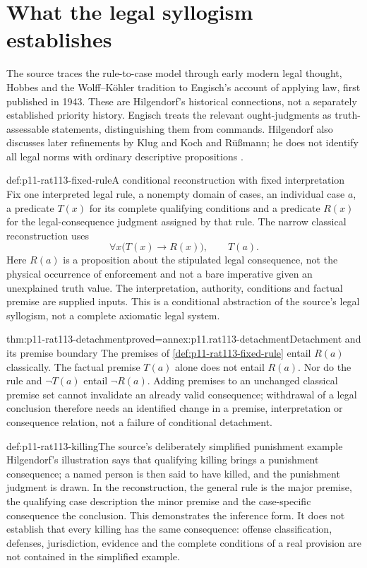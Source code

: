 \section{What the legal syllogism establishes}
\label{sec:p11-rat113-syllogism}

The source traces the rule-to-case model through early modern legal thought,
Hobbes and the Wolff--K\"ohler tradition to Engisch's account of applying
law, first published in 1943. These are Hilgendorf's historical connections,
not a separately established priority history. Engisch treats the relevant
ought-judgments as truth-assessable statements, distinguishing them from
commands. Hilgendorf also discusses later refinements by Klug and Koch and
R\"u\ss mann; he does not identify all legal norms with ordinary descriptive
propositions \parencite[pp.~661--662]{Hilgendorf2021LegalLogic}.

\begin{hbdefinition}{def:p11-rat113-fixed-rule}{A conditional reconstruction with fixed interpretation}
Fix one interpreted legal rule, a nonempty domain of cases, an individual
case \(a\), a predicate \(T(x)\) for its complete qualifying conditions
and a predicate \(R(x)\) for the legal-consequence judgment assigned by
that rule. The narrow classical reconstruction uses
\[
                  \forall x\bigl(T(x)\to R(x)\bigr),\qquad T(a).
\]
Here \(R(a)\) is a proposition about the stipulated legal consequence,
not the physical occurrence of enforcement and not a bare imperative
given an unexplained truth value. The interpretation, authority, conditions
and factual premise are supplied inputs. This is a conditional abstraction
of the source's legal syllogism, not a complete axiomatic legal system.
\end{hbdefinition}

\begin{hblemma}{thm:p11-rat113-detachment}{proved=annex:p11.rat113-detachment}{Detachment and its premise boundary}
The premises of \cref{def:p11-rat113-fixed-rule} entail \(R(a)\)
classically. The factual premise \(T(a)\) alone does not entail \(R(a)\).
Nor do the rule and \(\neg T(a)\) entail \(\neg R(a)\).
Adding premises to an unchanged classical premise set cannot invalidate
an already valid consequence; withdrawal of a legal conclusion therefore
needs an identified change in a premise, interpretation or consequence
relation, not a failure of conditional detachment.
\end{hblemma}

\begin{hbexample}{def:p11-rat113-killing}{The source's deliberately simplified punishment example}
Hilgendorf's illustration says that qualifying killing brings a punishment
consequence; a named person is then said to have killed, and the punishment
judgment is drawn. In the reconstruction, the general rule is the major
premise, the qualifying case description the minor premise and the
case-specific consequence the conclusion. This demonstrates the inference
form. It does not establish that every killing has the same consequence:
offense classification, defenses, jurisdiction, evidence and the complete
conditions of a real provision are not contained in the simplified example.
\end{hbexample}


